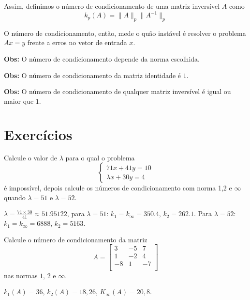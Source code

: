 Assim, definimos o número de condicionamento de uma matriz inversível $A$ como
$$k_p(A)=\|A\|_p \|A^{-1}\|_p$$

O número de condicionamento, então, mede o quão instável é resolver o problema $Ax=y$ frente a erros no vetor de entrada $x$.

{\bf Obs:} O número de condicionamento depende da norma escolhida.

{\bf Obs:} O número de condicionamento da matriz identidade é $1$.

{\bf Obs:} O número de condicionamento de qualquer matriz inversível é igual ou maior que $1$.

\section*{Exercícios}

\begin{Exercise} Calcule o valor de $\lambda$ para o qual o problema
$$\left\{ \begin{array}{l}71x+41y=10\\
\lambda x+30y=4
\end{array}
\right.$$
é impossível, depois calcule os números de condicionamento com norma 1,2 e $\infty$ quando $\lambda=51$ e $\lambda=52$.
\end{Exercise}
\begin{Answer}
  \begin{tiny}
$\lambda=\frac{71\times 30}{41}\approx  51.95122$, para $\lambda=51$: $k_1=k_\infty=350.4$, $k_2=262.1$. Para $\lambda=52$: $k_1=k_\infty= 6888$, $k_2=5163$.    
  \end{tiny}
\end{Answer}

\begin{Exercise}
  Calcule o número de condicionamento da matriz
$$A=\left[
\begin{array}{ccc}
3 & -5 & 7\\
1 & -2 & 4\\
-8 & 1 & -7\\
\end{array}
\right]$$
nas normas $1$, $2$ e $\infty$.
\end{Exercise}
\begin{Answer}
  \begin{tiny}
  $k_1(A)=36$, $k_2(A)=18,26$, $K_\infty(A)=20,8$.  
  \end{tiny}
\end{Answer}

